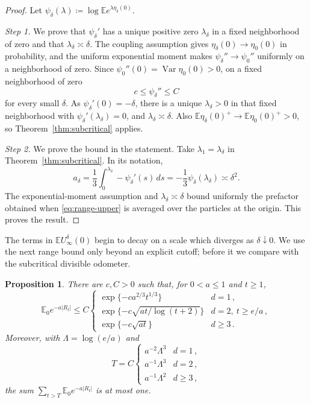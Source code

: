 \documentclass[11pt]{amsart}
\theoremstyle{plain}
\newtheorem{proposition}[theorem]{Proposition}
\theoremstyle{definition}
\newcommand{\E}{\mathbb{E}}
\DeclareMathOperator{\Var}{Var}
\begin{document}
\begin{proof}
	Let $\psi_\delta(\lambda)\coloneqq\log\E e^{\lambda\eta_\delta(0)}$.

	\smallskip
	\noindent\emph{Step 1.} We prove that $\psi_\delta'$ has a unique positive
	zero $\lambda_\delta$ in a fixed neighborhood of zero and that
	$\lambda_\delta\asymp\delta$.
	The coupling assumption gives $\eta_\delta(0)\to\eta_0(0)$ in probability,
	and the uniform exponential moment makes
	$\psi_\delta''\to\psi_0''$ uniformly on a neighborhood of zero. Since
	$\psi_0''(0)=\Var\eta_0(0)>0$, on a fixed neighborhood of zero
	\[
		c\leq\psi_\delta''\leq C
	\]
	for every small $\delta$. As $\psi_\delta'(0)=-\delta$, there is a unique $\lambda_\delta>0$ in that fixed neighborhood with
	$\psi_\delta'(\lambda_\delta)=0$, and
	$\lambda_\delta\asymp\delta$. Also
	$\E\eta_\delta(0)^+\to\E\eta_0(0)^+>0$, so
	Theorem~\ref{thm:subcritical} applies.

	\smallskip
	\noindent\emph{Step 2.} We prove the bound in the statement.
	Take $\lambda_1=\lambda_\delta$ in Theorem~\ref{thm:subcritical}. In its
	notation,
	\[
		a_\delta=\frac13\int_0^{\lambda_\delta}-\psi_\delta'(s)\,ds
		=-\frac13\psi_\delta(\lambda_\delta)\asymp\delta^2.
	\]
	The exponential-moment assumption and $\lambda_\delta\asymp\delta$ bound
	uniformly the prefactor obtained when \eqref{eq:range-upper} is averaged over
	the particles at the origin. This proves the result.
\end{proof}

The terms in $\E U_\infty^\delta(0)$ begin to decay on a scale which diverges as
$\delta\downarrow0$. We use the next range bound only beyond an explicit
cutoff; before it we compare with the subcritical divisible odometer.

\begin{proposition}\label{prop:resolvent}
	There are $c,C>0$ such that, for $0<a\leq1$ and $t\geq1$,
	\begin{equation}\label{eq:resolvent-pointwise}
		\E_0e^{-a|R_t|}\leq C
		\begin{cases}
			\exp\{-ca^{2/3}t^{1/3}\}&d=1\,,\\
			\exp\{-c\sqrt{at/\log(t+2)}\}&d=2,\ t\geq e/a\,,\\
			\exp\{-c\sqrt{at}\}&d\geq3\,.
		\end{cases}
	\end{equation}
	Moreover, with $\Lambda=\log(e/a)$ and
	\begin{equation}\label{eq:range-threshold}
		T=C
		\begin{cases}
			a^{-2}\Lambda^3&d=1\,,\\
			a^{-1}\Lambda^3&d=2\,,\\
			a^{-1}\Lambda^2&d\geq3\,,
		\end{cases}
	\end{equation}
	the sum $\sum_{t>T}\E_0e^{-a|R_t|}$ is at most one.
\end{proposition}
\end{document}
